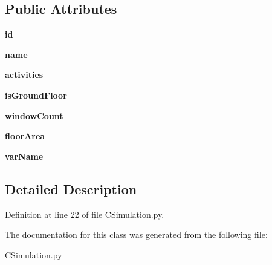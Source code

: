 \subsection*{Public Attributes}
\begin{DoxyCompactItemize}
\item 
\mbox{\label{class_c_simulation_1_1_simulation_1_1_building_1_1_zone_acf2488b95c97e0378c9bf49de3b50f28}} 
{\bfseries id}
\item 
\mbox{\label{class_c_simulation_1_1_simulation_1_1_building_1_1_zone_ab74e6bf80237ddc4109968cedc58c151}} 
{\bfseries name}
\item 
\mbox{\label{class_c_simulation_1_1_simulation_1_1_building_1_1_zone_a08c0739bec11d2023f4dd21bbeabb714}} 
{\bfseries activities}
\item 
\mbox{\label{class_c_simulation_1_1_simulation_1_1_building_1_1_zone_a3df48284086e38da278a8c79c6d199b2}} 
{\bfseries is\+Ground\+Floor}
\item 
\mbox{\label{class_c_simulation_1_1_simulation_1_1_building_1_1_zone_af9962569ba3722cc0b01fe3f47879707}} 
{\bfseries window\+Count}
\item 
\mbox{\label{class_c_simulation_1_1_simulation_1_1_building_1_1_zone_a21e09eb93e27b5c3eb6c553ef3ff19c1}} 
{\bfseries floor\+Area}
\item 
\mbox{\label{class_c_simulation_1_1_simulation_1_1_building_1_1_zone_aa7920c54f52119ab7bbecc3c9e6c3731}} 
{\bfseries var\+Name}
\end{DoxyCompactItemize}


\subsection{Detailed Description}


Definition at line 22 of file C\+Simulation.\+py.



The documentation for this class was generated from the following file\+:\begin{DoxyCompactItemize}
\item 
C\+Simulation.\+py\end{DoxyCompactItemize}
